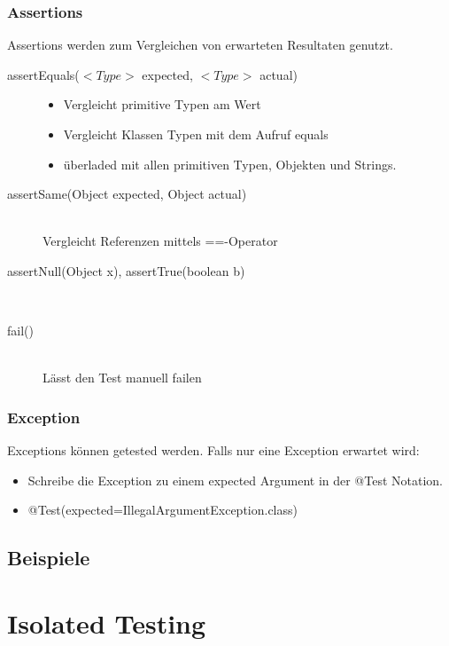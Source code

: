 \documentclass[a4paper,10pt]{article}
\begin{document}
\subsubsection{Assertions}
Assertions werden zum Vergleichen von erwarteten Resultaten genutzt.
\begin{description}
	\item[assertEquals($<Type>$ expected, $<Type>$ actual)] \hfill
		\begin{itemize}
			\item Vergleicht primitive Typen am Wert
			\item Vergleicht Klassen Typen mit dem Aufruf equals
			\item \"{u}berladed mit allen primitiven Typen, Objekten und Strings.
		\end{itemize}
	\item[assertSame(Object expected, Object actual)] \hfill \\
		Vergleicht Referenzen mittels ==-Operator
	\item[assertNull(Object x), assertTrue(boolean b)] \hfill \\
	\item[fail()] \hfill \\
		L\"{a}sst den Test manuell failen
\end{description}

\subsubsection{Exception}
Exceptions k\"{o}nnen getested werden. Falls nur eine Exception erwartet wird:
\begin{itemize}
	\item Schreibe die Exception  zu einem expected Argument in der @Test Notation.
	\item @Test(expected=IllegalArgumentException.class)
\end{itemize}

\subsection{Beispiele}


\pagebreak
\section{Isolated Testing}
\end{document}
